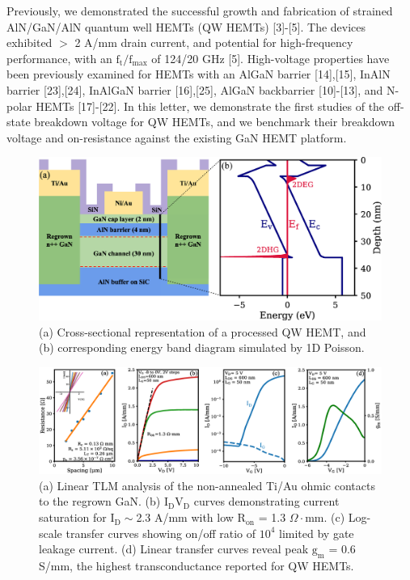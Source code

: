 \documentclass[journal]{IEEEtran}
\begin{document}
Previously, we demonstrated the successful growth and fabrication of strained AlN/GaN/AlN quantum well HEMTs (QW HEMTs) [3]-[5]. The devices exhibited $>$ 2 A/mm drain current, and potential for high-frequency performance, with an $\mathrm{f_t}/\mathrm{f_{max}}$ of 124/20 GHz [5]. High-voltage properties have been previously examined for HEMTs with an AlGaN barrier [14],[15], InAlN barrier [23],[24], InAlGaN barrier [16],[25], AlGaN backbarrier [10]-[13], and N-polar HEMTs [17]-[22]. In this letter, we demonstrate the first studies of the off-state breakdown voltage for QW HEMTs, and we benchmark their breakdown voltage and on-resistance against the existing GaN HEMT platform.
\begin{figure}[!b]
\centering
\includegraphics[width=\columnwidth]{Figure1.eps}
\caption{(a) Cross-sectional representation of a processed QW HEMT, and (b) corresponding energy band diagram simulated by 1D Poisson. }
\label{fig:epi}
\end{figure}

\begin{figure}[!t]
\centering
\includegraphics[width=\textwidth]{Figure2_shorter.eps}
\caption{(a) Linear TLM analysis of the non-annealed Ti/Au ohmic contacts to the regrown GaN. (b) $\mathrm{I_DV_D}$ curves demonstrating current saturation for $\mathrm{I_D}\sim$2.3 A/mm with low $\mathrm{R_{on}}$ = 1.3 $\Omega\cdot$mm. (c) Log-scale transfer curves showing on/off ratio of $\mathrm{10^4}$ limited by gate leakage current. (d) Linear transfer curves reveal peak $\mathrm{g_m}$ = 0.6 S/mm, the highest transconductance reported for QW HEMTs. }
\label{fig:IdVg}
\end{figure}
\end{document}

